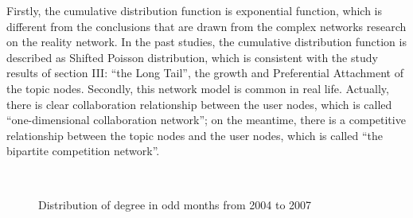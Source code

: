 \documentclass{elsarticle}
\begin{document}
Firstly, the cumulative distribution function is exponential function,
which is different from the conclusions that are drawn from the
complex networks research on the reality network. In the past studies,
the cumulative distribution function is described as Shifted Poisson
distribution, which is consistent with the study results of section
III: “the Long Tail”, the growth and Preferential Attachment of the
topic nodes. Secondly, this network model is common in real
life. Actually, there is clear collaboration relationship between the
user nodes, which is called “one-dimensional collaboration network”;
on the meantime, there is a competitive relationship between the topic
nodes and the user nodes, which is called “the bipartite competition
network”. 

\begin{figure}[htpb]
  \centering
  \subfigure[a]{
     \scalebox{0.18}{\texttt{[image: 07-1]}}
   } \quad
  \subfigure[b]{ 
       \scalebox{0.18}{\texttt{[image: 07-2]}}
   } 
   \
    \subfigure[c]{
     \scalebox{0.18}{\texttt{[image: 07-3]}}
   } \quad
  \subfigure[d]{ 
       \scalebox{0.18}{\texttt{[image: 07-4]}}
   } 
  

    \subfigure[e]{
     \scalebox{0.18}{\texttt{[image: 07-5]}}
   } \quad
  \subfigure[f]{ 
       \scalebox{0.18}{\texttt{[image: 07-6]}}
   } 

    \subfigure[g]{
     \scalebox{0.18}{\texttt{[image: 07-7]}}
   } \quad
  \subfigure[h]{ 
       \scalebox{0.18}{\texttt{[image: 07-8]}}
   } 
   \caption{Distribution of degree in odd months from 2004 to 2007}
\end{figure}
\end{document}
